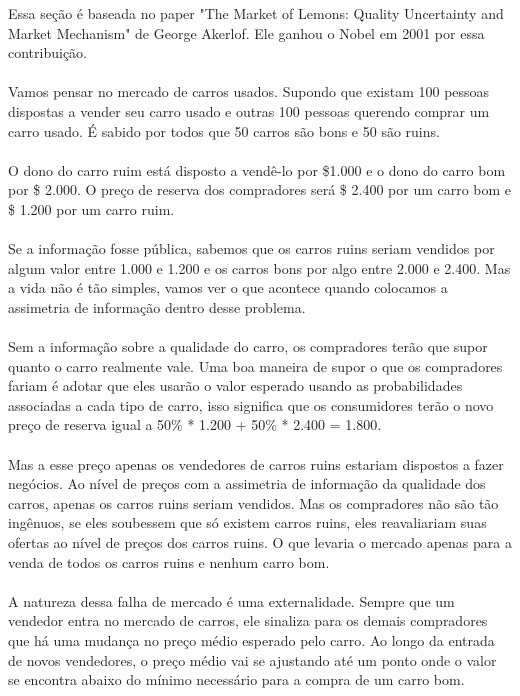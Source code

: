 \documentclass[a4paper,11pt,oneside]{book}
\theoremstyle{definition}
\theoremstyle{break}
\begin{document}
Essa seção é baseada no paper "The Market of Lemons: Quality Uncertainty and Market Mechanism" de George Akerlof. Ele ganhou o Nobel em 2001 por essa contribuição.
\\~\\
Vamos pensar no mercado de carros usados. Supondo que existam 100 pessoas dispostas a vender seu carro usado e outras 100 pessoas querendo comprar um carro usado. É sabido por todos que 50 carros são bons e 50 são ruins.
\\~\\
O dono do carro ruim está disposto a vendê-lo por \$1.000 e o dono do carro bom por \$ 2.000. O preço de reserva dos compradores será \$ 2.400 por um carro bom e \$ 1.200 por um carro ruim.
\\~\\
Se a informação fosse pública, sabemos que os carros ruins seriam vendidos por algum valor entre 1.000 e 1.200 e os carros bons por algo entre 2.000 e 2.400. Mas a vida não é tão simples, vamos ver o que acontece quando colocamos a assimetria de informação dentro desse problema.
\\~\\
Sem a informação sobre a qualidade do carro, os compradores terão que supor quanto o carro realmente vale. Uma boa maneira de supor o que os compradores fariam é adotar que eles usarão o valor esperado usando as probabilidades associadas a cada tipo de carro, isso significa que os consumidores terão o novo preço de reserva igual a 50\% * 1.200 + 50\% * 2.400 = 1.800.
\\~\\
Mas a esse preço apenas os vendedores de carros ruins estariam dispostos a fazer negócios. Ao nível de preços com a assimetria de informação da qualidade dos carros, apenas os carros ruins seriam vendidos. Mas os compradores não são tão ingênuos, se eles soubessem que só existem carros ruins, eles reavaliariam suas ofertas ao nível de preços dos carros ruins. O que levaria o mercado apenas para a venda de todos os carros ruins e nenhum carro bom.
\\~\\
A natureza dessa falha de mercado é uma externalidade. Sempre que um vendedor entra no mercado de carros, ele sinaliza para os demais compradores que há uma mudança no preço médio esperado pelo carro. Ao longo da entrada de novos vendedores, o preço médio vai se ajustando até um ponto onde o valor se encontra abaixo do mínimo necessário para a compra de um carro bom.
\end{document}

